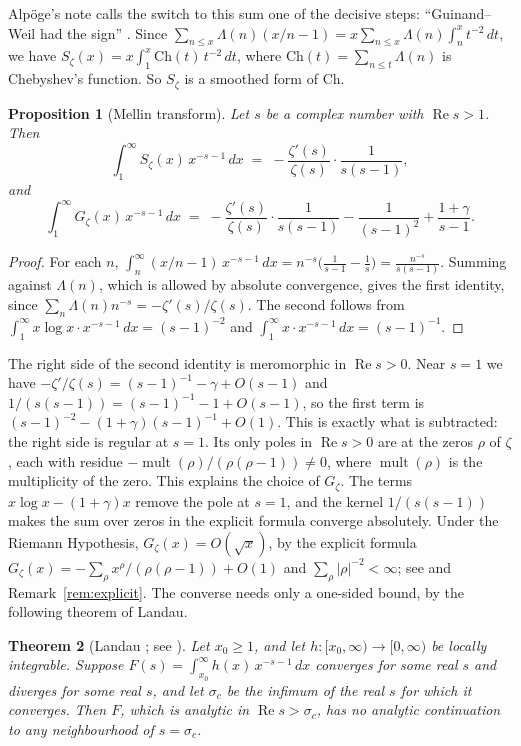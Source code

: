\documentclass[11pt]{amsbook}
\theoremstyle{plain}
\newtheorem{theorem}{Theorem}[section]
\newtheorem{proposition}[theorem]{Proposition}
\theoremstyle{definition}
\theoremstyle{remark}
\numberwithin{equation}{section}
\numberwithin{figure}{chapter}
\numberwithin{table}{chapter}
\newcommand{\Ch}{\mathrm{Ch}}
\newcommand{\Gz}{G_{\zeta}}
\newcommand{\Sz}{S_{\zeta}}
\begin{document}
Alp\"oge's note calls the switch to this sum one of the decisive
steps: ``Guinand--Weil had the sign''
\cite[p.~3, step~5]{AlpogeRemark2026}. Since
$\sum_{n \le x}\Lambda(n)(x/n - 1) = x\sum_{n\le x}\Lambda(n)
\int_n^x t^{-2}\,dt$, we have
$\Sz(x) = x\int_1^x \Ch(t)\,t^{-2}\,dt$, where
$\Ch(t) = \sum_{n \le t}\Lambda(n)$ is Chebyshev's function. So
$\Sz$ is a smoothed form of $\Ch$.

\begin{proposition}[Mellin transform]\label{prop:mellin}
Let $s$ be a complex number with $\operatorname{Re} s > 1$. Then
\[
  \int_1^\infty \Sz(x)\, x^{-s-1}\,dx
  \;=\; -\frac{\zeta'(s)}{\zeta(s)} \cdot \frac{1}{s(s-1)} ,
\]
and
\[
  \int_1^\infty \Gz(x)\, x^{-s-1}\,dx
  \;=\; -\frac{\zeta'(s)}{\zeta(s)} \cdot \frac{1}{s(s-1)}
  - \frac{1}{(s-1)^2} + \frac{1 + \gamma}{s - 1} .
\]
\end{proposition}

\begin{proof}
For each $n$, $\int_n^\infty (x/n - 1)\,x^{-s-1}\,dx
= n^{-s}\bigl(\frac{1}{s-1} - \frac{1}{s}\bigr)
= \frac{n^{-s}}{s(s-1)}$. Summing against $\Lambda(n)$, which is
allowed by absolute convergence, gives the first identity, since
$\sum_n \Lambda(n) n^{-s} = -\zeta'(s)/\zeta(s)$. The second follows
from $\int_1^\infty x\log x\cdot x^{-s-1}\,dx = (s-1)^{-2}$ and
$\int_1^\infty x\cdot x^{-s-1}\,dx = (s-1)^{-1}$.
\end{proof}

The right side of the second identity is meromorphic in
$\operatorname{Re} s > 0$. Near $s = 1$ we have
$-\zeta'/\zeta(s) = (s-1)^{-1} - \gamma + O(s-1)$ and
$1/(s(s-1)) = (s-1)^{-1} - 1 + O(s-1)$, so the first term is
$(s-1)^{-2} - (1+\gamma)(s-1)^{-1} + O(1)$. This is exactly what is
subtracted: the right side is regular at $s = 1$. Its only poles in
$\operatorname{Re} s > 0$ are at the zeros $\rho$ of $\zeta$, each
with residue $-\operatorname{mult}(\rho)/(\rho(\rho-1)) \ne 0$,
where $\operatorname{mult}(\rho)$ is the multiplicity of the zero.
This explains the choice of $\Gz$. The terms
$x\log x - (1+\gamma)x$ remove the pole at $s = 1$, and the kernel
$1/(s(s-1))$ makes the sum over zeros in the explicit formula
converge absolutely. Under the Riemann Hypothesis,
$\Gz(x) = O(\sqrt x)$, by the explicit formula
$\Gz(x) = -\sum_\rho x^\rho/(\rho(\rho-1)) + O(1)$ and
$\sum_\rho |\rho|^{-2} < \infty$; see \cite{Ingham1932} and
Remark~\ref{rem:explicit}. The converse needs only a one-sided
bound, by the following theorem of Landau.

\begin{theorem}[Landau \cite{Landau1905}; see \cite{Ingham1932}]
\label{thm:idea-landau}
Let $x_0 \ge 1$, and let $h\colon [x_0, \infty) \to [0, \infty)$ be
locally integrable. Suppose
$F(s) = \int_{x_0}^\infty h(x)\,x^{-s-1}\,dx$ converges for some
real $s$ and diverges for some real $s$, and let $\sigma_c$ be the
infimum of the real $s$ for which it converges. Then $F$, which is
analytic in $\operatorname{Re} s > \sigma_c$, has no analytic
continuation to any neighbourhood of $s = \sigma_c$.
\end{theorem}
\end{document}
